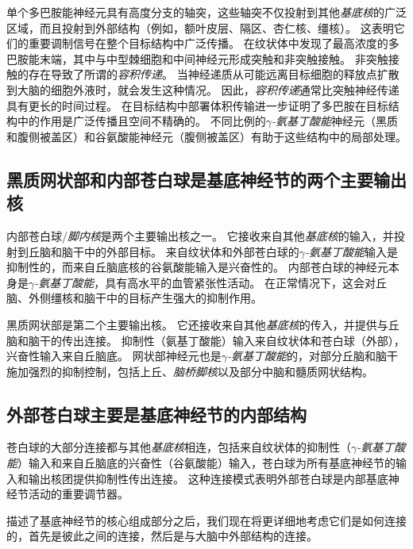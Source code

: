 单个多巴胺能神经元具有高度分支的轴突，这些轴突不仅投射到其他\textit{基底核}的广泛区域，而且投射到外部结构（例如，额叶皮层、隔区、杏仁核、缰核）。
这表明它们的重要调制信号在整个目标结构中广泛传播。
在纹状体中发现了最高浓度的多巴胺能末端，其中与中型棘细胞和中间神经元形成突触和非突触接触。
非突触接触的存在导致了所谓的\textit{容积传递}。
当神经递质从可能远离目标细胞的释放点扩散到大脑的细胞外液时，就会发生这种情况。
因此，\textit{容积传递}通常比突触神经传递具有更长的时间过程。
在目标结构中部署体积传输进一步证明了多巴胺在目标结构中的作用是广泛传播且空间不精确的。
不同比例的\textit{$\gamma$-氨基丁酸能}神经元（黑质和腹侧被盖区）和谷氨酸能神经元（腹侧被盖区）有助于这些结构中的局部处理。



\subsection{黑质网状部和内部苍白球是基底神经节的两个主要输出核}

内部苍白球/\textit{脚内核}是两个主要输出核之一。
它接收来自其他\textit{基底核}的输入，并投射到丘脑和脑干中的外部目标。
来自纹状体和外部苍白球的\textit{$\gamma$-氨基丁酸能}输入是抑制性的，而来自丘脑底核的谷氨酸能输入是兴奋性的。
内部苍白球的神经元本身是\textit{$\gamma$-氨基丁酸能}，具有高水平的血管紧张性活动。
在正常情况下，这会对丘脑、外侧缰核和脑干中的目标产生强大的抑制作用。


黑质网状部是第二个主要输出核。
它还接收来自其他\textit{基底核}的传入，并提供与丘脑和脑干的传出连接。
抑制性（氨基丁酸能）输入来自纹状体和苍白球（外部），兴奋性输入来自丘脑底。
网状部神经元也是\textit{$\gamma$-氨基丁酸能}的，对部分丘脑和脑干施加强烈的抑制控制，包括上丘、\textit{脑桥脚核}以及部分中脑和髓质网状结构。



\subsection{外部苍白球主要是基底神经节的内部结构}

苍白球的大部分连接都与其他\textit{基底核}相连，包括来自纹状体的抑制性（\textit{$\gamma$-氨基丁酸能}）输入和来自丘脑底的兴奋性（谷氨酸能）输入，苍白球为所有基底神经节的输入和输出核团提供抑制性传出连接。
这种连接模式表明外部苍白球是内部基底神经节活动的重要调节器。


描述了基底神经节的核心组成部分之后，我们现在将更详细地考虑它们是如何连接的，首先是彼此之间的连接，然后是与大脑中外部结构的连接。



